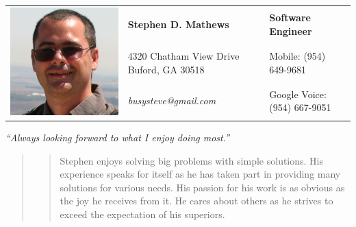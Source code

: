 \documentclass[10pt]{report}
\begin{document}
{
\setlength{\arrayrulewidth}{.4em}

\noindent
\begin{table}
\begin{tabular}{ L{5em} L{.5\textwidth}  R{.35\textwidth} }
\hline
{}
& \textbf{Stephen D. Mathews} & \textbf{Software Engineer} \\
& 4320 Chatham View Drive Buford, GA 30518 & Mobile: (954) 649-9681 \\
& \textsl{busysteve@gmail.com} &  Google Voice: (954) 667-9051 \\
\hline
\end{tabular}
	\center
	\textsl{``Always looking forward to what I enjoy doing most.''}
	\begin{quote}
		\begin{quote}
			Stephen enjoys solving big problems with simple solutions. His experience speaks for itself as he has taken part in providing many solutions for various needs. His passion for his work is as obvious as the joy he receives from it. He cares about others as he strives to exceed the expectation of his superiors.
		\end{quote}
	\end{quote}
\end{table}
}


\end{document}
